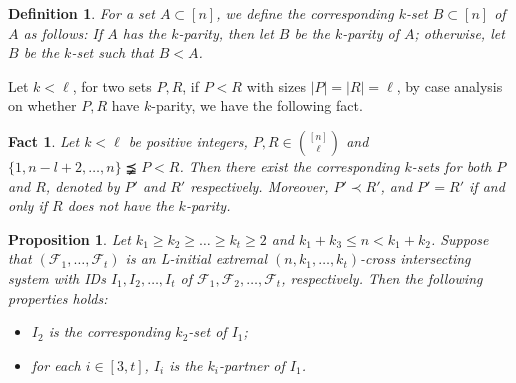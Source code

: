 \documentclass[a4paper,11pt]{article}
\newtheorem{definition}[theorem]{Definition}
\newtheorem{fact}[theorem]{Fact}
\newtheorem{proposition}[theorem]{Proposition}
\begin{document}

\begin{definition}\label{R_2}
For a set $A\subset [n]$, we define the {\it corresponding $k$-set} $B\subset [n]$ of $A$ as follows:  If $A$ has the $k$-parity, then let $B$ be the $k$-parity of $A$; otherwise, let $B$ be the $k$-set such that $B< A$.
\end{definition}

Let $k<\ell$, 
for two sets $P, R$, if $P<R$ with sizes $|P|=|R|=\ell$,  by case analysis on whether $P, R$ have
$k$-parity, we have the following fact.


\begin{fact}\label{correspondingk}
Let $k<\ell$ be positive integers, $P, R\in {[n]\choose \ell}$ and $\{1, n-l+2, \dots, n\} \precneqq  P<R$. Then there exist the  corresponding $k$-sets for both $P$ and $R$, denoted by $P'$ and $R'$ respectively. Moreover, $P'\prec R'$, and $P'=R'$ if and only if $R$ does not have  the $k$-parity.
\end{fact}

 
 
 
 
 




\begin{proposition}\label{7-18-1}
Let $k_1\geq k_2\geq\dots\geq k_t\geq 2$ and $k_1+k_3\leq n <k_1+k_2$.
Suppose that $(\mathcal{F}_1, \dots, \mathcal{F}_t)$ is an L-initial extremal $(n, k_1, \dots, k_t)$-cross intersecting system with  IDs $I_1, I_2, \dots, I_t$  of $\mathcal{F}_1, \mathcal{F}_2, \dots, \mathcal{F}_t$, respectively. Then the following properties holds:
\begin{itemize}
\item[(i)] $I_2$ is the corresponding $k_2$-set of $I_1$;
\item[(ii)] for each $i\in [3, t]$, $I_i$ is the $k_i$-partner of $I_1$.
\end{itemize}
\end{proposition}
\end{document}
